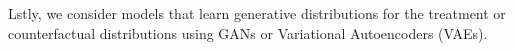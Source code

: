 Lstly, we consider models that learn generative distributions for the treatment or counterfactual distributions using GANs or Variational Autoencoders (VAEs). 